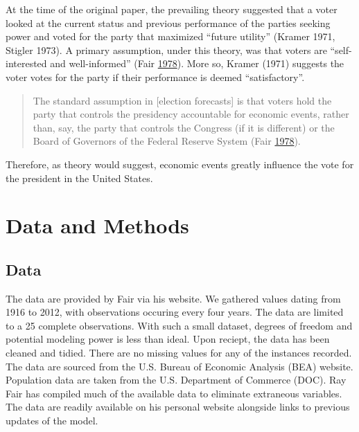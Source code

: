 \documentclass[11,]{article}
\begin{document}
At the time of the original paper, the prevailing theory suggested that
a voter looked at the current status and previous performance of the
parties seeking power and voted for the party that maximized ``future
utility'' (Kramer 1971, Stigler 1973). A primary assumption, under this
theory, was that voters are ``self-interested and well-informed'' (Fair
\protect\hyperlink{ref-fair_effect_1978}{1978}). More so, Kramer (1971)
suggests the voter votes for the party if their performance is deemed
``satisfactory''.

\begin{quote}
The standard assumption in {[}election forecasts{]} is that voters hold
the party that controls the presidency accountable for economic events,
rather than, say, the party that controls the Congress (if it is
different) or the Board of Governors of the Federal Reserve System (Fair
\protect\hyperlink{ref-fair_effect_1978}{1978}).
\end{quote}

Therefore, as theory would suggest, economic events greatly influence
the vote for the president in the United States.

\hypertarget{data-and-methods}{%
\section{Data and Methods}\label{data-and-methods}}

\hypertarget{data}{%
\subsection{Data}\label{data}}

The data are provided by Fair via his website. We gathered values dating
from 1916 to 2012, with observations occuring every four years. The data
are limited to a 25 complete observations. With such a small dataset,
degrees of freedom and potential modeling power is less than ideal. Upon
reciept, the data has been cleaned and tidied. There are no missing
values for any of the instances recorded. The data are sourced from the
U.S. Bureau of Economic Analysis (BEA) website. Population data are
taken from the U.S. Department of Commerce (DOC). Ray Fair has compiled
much of the available data to eliminate extraneous variables. The data
are readily available on his personal website alongside links to
previous updates of the model.
\end{document}
